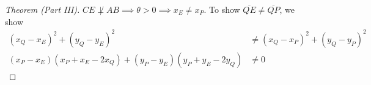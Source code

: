 


\begin{proof}[Theorem (Part III)]
$CE \not\perp AB \implies \theta>0 \implies x_{E} \ne x_{P}$. To show 
$\overline{QE}\ne\overline{QP}$, we show 
\begin{align*}
(x_{Q}-x_{E})^{2} + (y_{Q}-y_{E})^{2}
& \ne (x_{Q}-x_{P})^{2} + (y_{Q}-y_{P})^{2}
\\
(x_{P}-x_{E}) (x_{P}+x_{E}-2x_{Q})
+ (y_{P}-y_{E}) (y_{P}+y_{E}-2y_{Q})
& \ne 0
\end{align*}
\end{proof}


